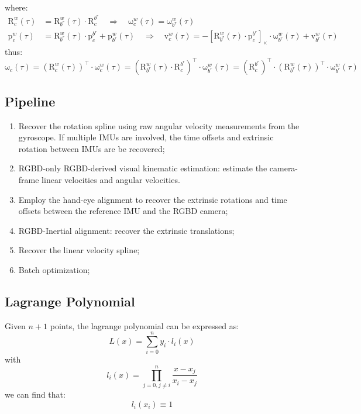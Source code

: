 \documentclass[12pt, onecolumn]{article}
\newcommand\liehat[1]{\left[ #1 \right]_\times}
\newcommand\bsm[1]{\boldsymbol{\mathrm{#1}}}
\newcommand\rotation[2]{{\bsm{R}_{#1}^{#2}}}
\newcommand\angvel[2]{{\bsm{\omega}_{#1}^{#2}}}
\newcommand\translation[2]{{\bsm{p}_{#1}^{#2}}}
\newcommand\linvel[2]{{\bsm{v}_{#1}^{#2}}}
\begin{document}
	where:
	\begin{equation}
	\begin{aligned}
		\rotation{c}{w}(\tau)&=\rotation{b^r}{w}(\tau)\cdot\rotation{c}{b^r}
		\quad\Rightarrow\quad
		\angvel{c}{w}(\tau)=\angvel{b^r}{w}(\tau)
		\\
		\translation{c}{w}(\tau)&=\rotation{b^r}{w}(\tau)\cdot\translation{c}{b^r}+\translation{b^r}{w}(\tau)
		\quad\Rightarrow\quad
		\linvel{c}{w}(\tau)=-\liehat{\rotation{b^r}{w}(\tau)\cdot\translation{c}{b^r}}\cdot\angvel{b^r}{w}(\tau)+\linvel{b^r}{w}(\tau)
	\end{aligned}
	\end{equation}
	thus:
	\begin{equation}
	\bsm{\omega}_c(\tau)=\left( \rotation{c}{w}(\tau)\right)^\top\cdot\angvel{c}{w}(\tau)=\left( 
	\rotation{b^r}{w}(\tau)\cdot\rotation{c}{b^r}\right)^\top \cdot\angvel{b^r}{w}(\tau)=\left( 
		\rotation{c}{b^r}\right)^\top \cdot\left( 
				\rotation{b^r}{w}(\tau)\right)^\top \cdot\angvel{b^r}{w}(\tau)
	\end{equation}
	
	\subsection{Pipeline}
	\begin{enumerate}
	\item Recover the rotation spline using raw angular velocity measurements from the gyroscope. If multiple IMUs are involved, the time offsets and extrinsic rotation between IMUs are be recovered;
	
	\item RGBD-only RGBD-derived visual kinematic estimation: estimate the camera-frame linear velocities and angular velocities.
	
	\item Employ the hand-eye alignment to recover the extrinsic rotations and time offsets between the reference IMU and the RGBD camera;
	
	\item RGBD-Inertial alignment: recover the extrinsic translations;
	
	\item Recover the linear velocity spline;
	
	\item Batch optimization;
	\end{enumerate}
	
	\subsection{Lagrange Polynomial}
	Given $n+1$ points, the lagrange polynomial can be expressed as:
	\begin{equation}
	L(x)=\sum_{i=0}^{n}y_i\cdot l_i(x)
	\end{equation}
	with
	\begin{equation}
	l_i(x)=\prod_{j=0,j\ne i}^{n}\frac{x-x_j}{x_i-x_j}
	\end{equation}
	we can find that:
	\begin{equation}
	l_i(x_i)\equiv 1
	\end{equation}
	
\end{document}
